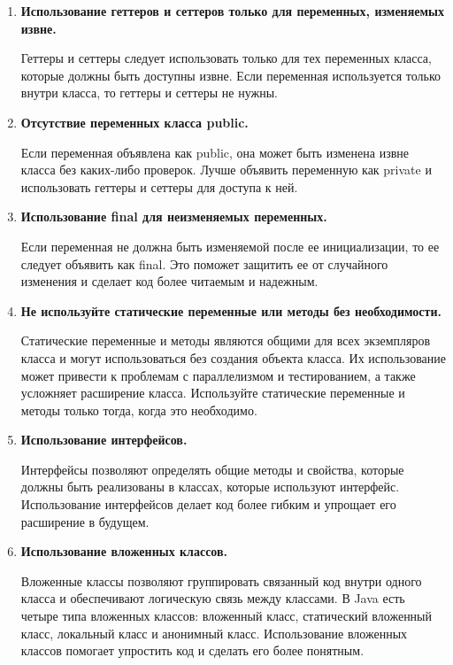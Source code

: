\documentclass[12pt, a4paper]{book}%
\begin{document}
{\begin{enumerate}
\item {\bf Использование геттеров и сеттеров только для переменных, изменяемых извне.}

Геттеры и сеттеры следует использовать только для тех переменных класса, которые должны быть доступны извне. Если переменная используется только внутри класса, то геттеры и сеттеры не нужны.

\item {\bf Отсутствие переменных класса public.}

Если переменная объявлена как public, она может быть изменена извне класса без каких-либо проверок. Лучше объявить переменную как private и использовать геттеры и сеттеры для доступа к ней. 

\item {\bf Использование final для неизменяемых переменных.}

Если переменная не должна быть изменяемой после ее инициализации, то ее следует объявить как final. Это поможет защитить ее от случайного изменения и сделает код более читаемым и надежным. 

\item {\bf Не используйте статические переменные или методы без необходимости.}

Статические переменные и методы являются общими для всех экземпляров класса и могут использоваться без создания объекта класса. Их использование может привести к проблемам с параллелизмом и тестированием, а также усложняет расширение класса. Используйте статические переменные и методы только тогда, когда это необходимо.

\item {\bf Использование интерфейсов.}

Интерфейсы позволяют определять общие методы и свойства, которые должны быть реализованы в классах, которые используют интерфейс. Использование интерфейсов делает код более гибким и упрощает его расширение в будущем.

\item {\bf Использование вложенных классов.}

Вложенные классы позволяют группировать связанный код внутри одного класса и обеспечивают логическую связь между классами. В Java есть четыре типа вложенных классов: вложенный класс, статический вложенный класс, локальный класс и анонимный класс. Использование вложенных классов помогает упростить код и сделать его более понятным.


\end{enumerate}

}
\end{document}
